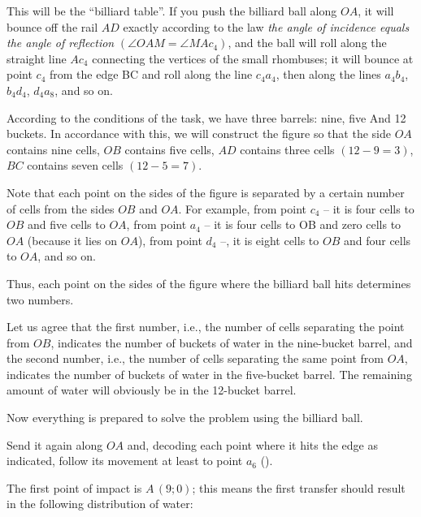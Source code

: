 This will be the ``billiard table''. If you push the billiard ball along $OA$, it will bounce off the rail $AD$ exactly according to the law \emph{the angle of incidence equals the angle of reflection} $(\angle OAM = \angle MAc_{4})$, and the ball will roll along the straight line $Ac_{4}$ connecting the vertices of the small rhombuses; it will bounce at point $c_{4}$ from the edge BC and roll along the line $c_{4}a_{4}$, then along the lines $a_{4}b_{4}$, $b_{4}d_{4}$, $d_{4}a_{8}$, and so on.

According to the conditions of the task, we have three barrels: nine, five And 12 buckets. In accordance with this, we will construct the figure so that the side $OA$ contains nine cells, $OB$ contains five cells, $AD$ contains three cells $(12 - 9 = 3)$, $BC$ contains seven cells $(12 - 5 = 7)$.


Note that each point on the sides of the figure is separated by a certain number of cells from the sides $OB$ and $OA$. For example, from point $c_{4}$ -- it is four cells to $OB$ and five cells to $OA$, from point $a_{4}$ -- it is four cells to OB and zero cells to $OA$ (because it lies on $OA$), from point $d_{4}$ --, it is eight cells to $OB$ and four cells to $OA$, and so on.

Thus, each point on the sides of the figure where the billiard ball hits determines two numbers.

Let us agree that the first number, i.e., the number of cells separating the point from $OB$, indicates the number of buckets of water in the nine-bucket barrel, and the second number, i.e., the number of cells separating the same point from $OA$, indicates the number of buckets of water in the five-bucket barrel. The remaining amount of water will obviously be in the 12-bucket barrel.

Now everything is prepared to solve the problem using the billiard ball.

Send it again along $OA$ and, decoding each point where it hits the edge as indicated, follow its movement at least to point $a_{6}$ ().

The first point of impact is $A \,(9; 0)$; this means the first transfer should result in the following distribution of water:

